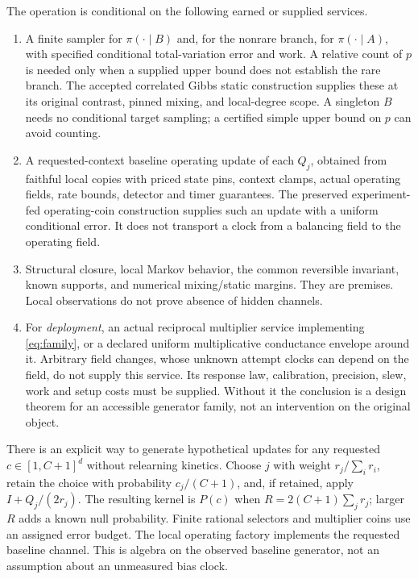 \documentclass[11pt]{article}
\begin{document}
The operation is conditional on the following earned or supplied services.
\begin{enumerate}
\item A finite sampler for $\pi(\cdot\mid B)$ and, for the nonrare branch,
for $\pi(\cdot\mid A)$, with specified conditional total-variation error
and work. A relative count of $p$ is needed only when a supplied upper
bound does not establish the rare branch. The accepted correlated Gibbs
static construction supplies these at its original contrast, pinned
mixing, and local-degree scope. A singleton $B$ needs no conditional
target sampling; a certified simple upper bound on $p$ can avoid counting.
\item A requested-context baseline operating update of each $Q_j$, obtained
from faithful local copies with priced state pins, context clamps, actual
operating fields, rate bounds, detector and timer guarantees. The
preserved experiment-fed operating-coin construction supplies such an
update with a uniform conditional error. It does not transport a clock
from a balancing field to the operating field.
\item Structural closure, local Markov behavior, the common reversible
invariant, known supports, and numerical mixing/static margins. They are
premises. Local observations do not prove absence of hidden channels.
\item For \emph{deployment}, an actual reciprocal multiplier service
implementing \eqref{eq:family}, or a declared uniform multiplicative
conductance envelope around it. Arbitrary field changes, whose unknown
attempt clocks can depend on the field, do not supply this service.
Its response law, calibration, precision, slew, work and setup costs must
be supplied. Without it the conclusion is a design theorem for an
accessible generator family, not an intervention on the original object.
\end{enumerate}

There is an explicit way to generate hypothetical updates for any requested
$c\in[1,C+1]^d$ without relearning kinetics. Choose $j$ with weight
$r_j/\sum_i r_i$, retain the choice with probability $c_j/(C+1)$, and,
if retained, apply $I+Q_j/(2r_j)$. The resulting kernel is $P(c)$ when
$R=2(C+1)\sum_jr_j$; larger $R$ adds a known null probability.
Finite rational selectors and multiplier coins use an assigned error
budget. The local operating factory implements the requested baseline
channel. This is algebra on the observed baseline generator, not an
assumption about an unmeasured bias clock.
\end{document}

